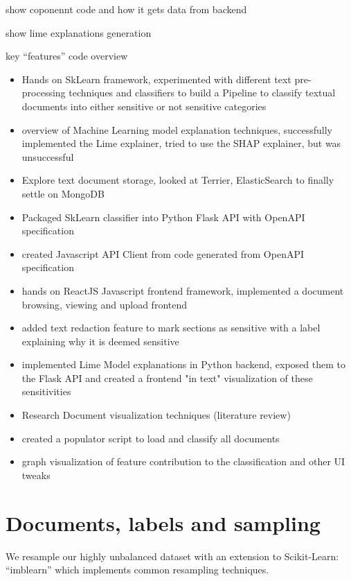 \documentclass{l4proj}
\begin{document}
show coponennt code and how it gets data from backend

show lime explanations generation

key ``features'' code overview


\begin{itemize}
    \item Hands on SkLearn framework, experimented with different text pre-processing techniques and classifiers to build a Pipeline to classify textual documents into either sensitive or not sensitive categories
    \item overview of Machine Learning model explanation techniques, successfully implemented the Lime explainer, tried to use the SHAP explainer, but was unsuccessful
    \item Explore text document storage, looked at Terrier, ElasticSearch to finally settle on MongoDB
    \item Packaged SkLearn classifier into Python Flask API with OpenAPI specification
    \item created Javascript API Client from code generated from OpenAPI specification
    \item hands on ReactJS Javascript frontend framework, implemented a document browsing, viewing and upload frontend
    \item added text redaction feature to mark sections as sensitive with a label explaining why it is deemed sensitive
    \item implemented Lime Model explanations in Python backend, exposed them to the Flask API and created a frontend "in text" visualization of these sensitivities
    \item Research Document visualization techniques (literature review)
    \item created a populator script to load and classify all documents
    \item graph visualization of feature contribution to the classification and other UI tweaks
\end{itemize}

\section{Documents, labels and sampling}

We resample our highly unbalanced dataset with an extension to Scikit-Learn: ``imblearn'' which implements common resampling techniques\autocite{lemaitreImbalancedlearnPythonToolbox2017}.
\end{document}
